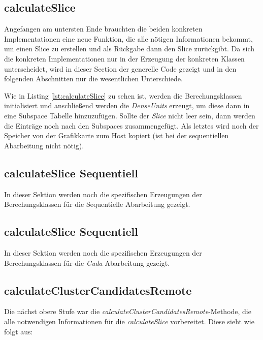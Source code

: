 \subsection{calculateSlice}
Angefangen am untersten Ende brauchten die beiden konkreten Implementationen eine neue Funktion, die alle nötigen Informationen 
bekommt, um einen Slice zu erstellen und als Rückgabe dann den Slice zurückgibt. Da sich die konkreten Implementationen nur in der 
Erzeugung der konkreten Klassen unterscheidet, wird in dieser Section der generelle Code gezeigt und in den folgenden Abschnitten 
nur die wesentlichen Unterschiede.  



Wie in Listing \ref{lst:calculateSlice} zu sehen ist, werden die Berechungsklassen initialisiert und anschließend werden die 
\emph{DenseUnits} erzeugt, um diese dann in eine Subspace Tabelle hinzuzufügen. Sollte der \emph{Slice} nicht leer sein, dann 
werden die Einträge noch nach den Subspaces zusammengefügt. Als letztes wird noch der Speicher von der Grafikkarte zum Host kopiert 
(ist bei der sequentiellen Abarbeitung nicht nötig). 

\subsection{calculateSlice Sequentiell}
In dieser Sektion werden noch die spezifischen Erzeugungen der Berechungsklassen für die Sequentielle Abarbeitung gezeigt.



\subsection{calculateSlice Sequentiell}
In dieser Sektion werden noch die spezifischen Erzeugungen der Berechungsklassen für die \emph{Cuda} Abarbeitung gezeigt.



\subsection{calculateClusterCandidatesRemote}
Die nächst obere Stufe war die \emph{calculateClusterCandidatesRemote}-Methode, die alle notwendigen 
Informationen für die \emph{calculateSlice} vorbereitet. Diese sieht wie folgt aus:

